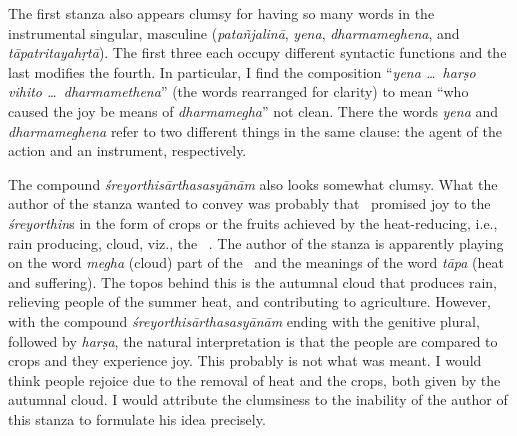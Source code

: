 The first stanza also appears clumsy for having so many words in the instrumental singular, masculine (\emph{patañjalinā}, \emph{yena}, \emph{dharmameghena}, and \emph{tāpatritayahṛtā}). The first three each occupy different syntactic functions and the last modifies the fourth. In particular, I find the composition ``\emph{yena \ldots\ harṣo vihito \ldots\ dharmamethena}'' (the words rearranged for clarity) to mean ``who caused the joy be means of \emph{dharmamegha}'' not clean. There the words \emph{yena} and \emph{dharmameghena} refer to two different things in the same clause: the agent of the action and an instrument, respectively.

The compound \emph{śreyorthisārthasasyānām} also looks somewhat clumsy. What the author of the stanza wanted to convey was probably that \Patanjali\ promised joy to the \emph{śreyo\-rthin}s in the form of crops or the fruits achieved by the heat-reducing, i.e., rain producing, cloud, viz., the \Dharmamegha\ \samadhi. The author of the stanza is apparently playing on the word \emph{megha} (cloud) part of the \Dharmamegha\ and the meanings of the word \emph{tāpa} (heat and suffering). The topos behind this is the autumnal cloud that produces rain, relieving people of the summer heat, and contributing to  agriculture. However, with the compound \emph{śreyo\-rthi\-sārtha\-sasyānām} ending with the genitive plural, followed by \emph{harṣa}, the natural interpretation is that the people are compared to crops and they experience joy. This probably is not what was meant. I would think people rejoice due to the removal of heat and the crops, both given by the autumnal cloud. %
I would attribute the clumsiness to the inability of the author of this stanza to formulate his idea precisely.

